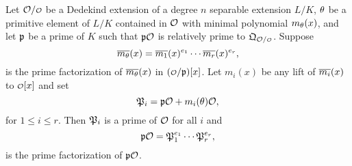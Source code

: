     \begin{theorem*}
      Let $\mc{O}/\smc{O}$ be a Dedekind extension of a degree $n$ separable extension $L/K$, $\theta$ be a primitive element of $L/K$ contained in $\mathcal{O}$ with minimal polynomial $m_{\theta}(x)$, and let $\mathfrak{p}$ be a prime of $K$ such that $\mathfrak{p}\mathcal{O}$ is relatively prime to $\mf{Q}_{\mc{O}/\smc{O}}$. Suppose
      \[
        \overline{m_{\theta}}(x) = \overline{m_{1}}(x)^{e_{1}} \cdots \overline{m_{r}}(x)^{e_{r}},
      \]
      is the prime factorization of $\overline{m_{\theta}}(x)$ in $(\smc{O}/\mf{p})[x]$. Let $m_{i}(x)$ be any lift of $\overline{m_{i}}(x)$ to $\smc{O}[x]$ and set
      \[
        \mathfrak{P}_{i} = \mathfrak{p}\mathcal{O}+m_{i}(\theta)\mathcal{O},
      \]
      for $1 \le i \le r$. Then $\mathfrak{P}_{i}$ is a prime of $\mathcal{O}$ for all $i$ and
      \[
        \mathfrak{p}\mathcal{O} = \mathfrak{P}_{1}^{e_{1}} \cdots \mathfrak{P}_{r}^{e_{r}},
      \]
      is the prime factorization of $\mathfrak{p}\mathcal{O}$.
    \end{theorem*}
